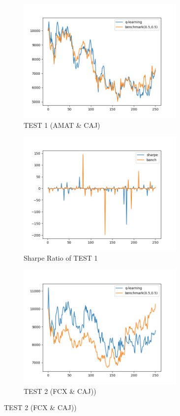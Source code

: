 \begin{figure}[H]
\begin{subfigure}{.5\textwidth}%
\centering
\includegraphics[clip, width=0.9\textwidth]{Graphics/TestAC3.png} \caption{TEST 1 (AMAT \& CAJ)} 
\end{subfigure}%
\begin{subfigure}{.5\textwidth}%
\centering
\includegraphics[clip, width=0.9\textwidth]{Graphics/TESTAC3S.png} \caption{Sharpe Ratio of TEST 1}
\end{subfigure}%
\vspace{0.1cm}
\begin{subfigure}{.5\textwidth}%
\centering
\includegraphics[clip, width=0.9\textwidth]{Graphics/TESTFC3.png} \caption{TEST 2 (FCX \& CAJ))} 

\end{subfigure}
\end{figure}

